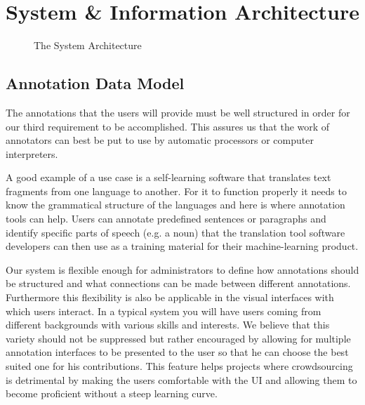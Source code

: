 \section{\KAT System \& Information Architecture}\label{sec:sysarch}

\begin{figure}[ht]\centering

\caption{The \KAT System Architecture}\label{fig:kat-arch}
\end{figure}

\subsection{\KAT Annotation Data Model}
The annotations that the users will provide must be well structured in order for our third
requirement to be accomplished. This assures us that the work of annotators can best be
put to use by automatic processors or computer interpreters.

A good example of a use case is a self-learning software that translates text fragments
from one language to another.  For it to function properly it needs to know the
grammatical structure of the languages and here is where annotation tools can help.  Users
can annotate predefined sentences or paragraphs and identify specific parts of speech
(e.g. a noun) that the translation tool software developers can then use as a training
material for their machine-learning product.

Our system is flexible enough for administrators to
define how annotations should be structured and what connections can be made between
different annotations.  Furthermore this flexibility is also be applicable in the
visual interfaces with which users interact. In a typical system you will have users
coming from different backgrounds with various skills and interests. We believe that this
variety should not be suppressed but rather encouraged by allowing for multiple annotation
interfaces to be presented to the user so that he can choose the best suited one for his
contributions. This feature helps projects where crowdsourcing is detrimental by making
the users comfortable with the UI and allowing them to become proficient without a steep
learning curve.

